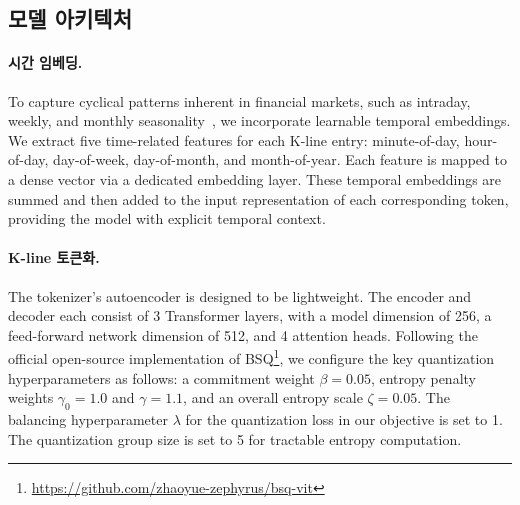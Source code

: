 \begin{table}[t!]
  \centering

  \caption{Kronos 모델 계열의 하이퍼파라미터 설정. 모든 모델은 AdamW 옵티마이저로 학습된다.}
  \label{tab:training_params}
\end{table}

\subsection{모델 아키텍처}

\paragraph{시간 임베딩.} To capture cyclical patterns inherent in financial markets, such as intraday, weekly, and monthly seasonality~\cite{ozenbas2008intra,kohli1992week}, we incorporate learnable temporal embeddings. We extract five time-related features for each K-line entry: minute-of-day, hour-of-day, day-of-week, day-of-month, and month-of-year. Each feature is mapped to a dense vector via a dedicated embedding layer. These temporal embeddings are summed and then added to the input representation of each corresponding token, providing the model with explicit temporal context.

\paragraph{K-line 토큰화.} The tokenizer's autoencoder is designed to be lightweight. The encoder and decoder each consist of 3 Transformer layers, with a model dimension of 256, a feed-forward network dimension of 512, and 4 attention heads. Following the official open-source implementation of BSQ\footnote{\url{https://github.com/zhaoyue-zephyrus/bsq-vit}}, we configure the key quantization hyperparameters as follows: a commitment weight $\beta=0.05$, entropy penalty weights $\gamma_0=1.0$ and $\gamma=1.1$, and an overall entropy scale $\zeta=0.05$. The balancing hyperparameter $\lambda$ for the quantization loss in our objective is set to 1. The quantization group size is set to 5 for tractable entropy computation.

